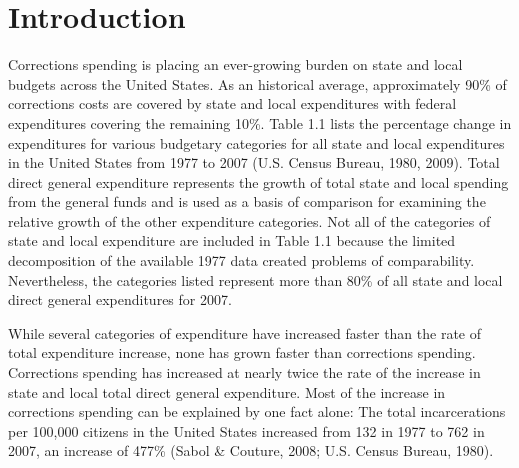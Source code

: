 \chapter{Introduction}

Corrections spending is placing an ever-growing burden on state and local budgets across the United States.  As an historical average, approximately 90\% of corrections costs are covered by state and local expenditures with federal expenditures covering the remaining 10\%.  Table 1.1 lists the percentage change in expenditures for various budgetary categories for all state and local expenditures in the United States from 1977 to 2007 (U.S. Census Bureau, 1980, 2009).  Total direct general expenditure represents the growth of total state and local spending from the general funds and is used as a basis of comparison for examining the relative growth of the other expenditure categories.  Not all of the categories of state and local expenditure are included in Table 1.1 because the limited decomposition of the available 1977 data created problems of comparability. Nevertheless, the categories listed represent more than 80\% of all state and local direct general expenditures for 2007.

While several categories of expenditure have increased faster than the rate of total expenditure increase, none has grown faster than corrections spending.  Corrections spending has increased at nearly twice the rate of the increase in state and local total direct general expenditure.  Most of the increase in corrections spending can be explained by one fact alone:  The total incarcerations per 100,000 citizens in the United States increased from 132 in 1977 to 762 in 2007, an increase of 477\% (Sabol \& Couture, 2008; U.S. Census Bureau, 1980).

